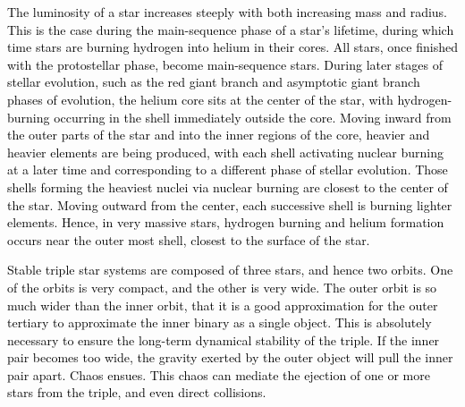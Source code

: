 \documentclass[main.tex]{subfiles}
\begin{document}
\begin{tcolorbox}[sharp corners, colback=blue!30, colframe=blue!80!blue, title=Box \refstepcounter{educhap1}\label{boxchap1:lum2 }\ref{boxchap1:lum2} -- Dependence of luminosity on Mass and Radius]
\par \textcolor{black} {The luminosity of a star increases steeply with both increasing mass and radius.  This is the case during the main-sequence phase of a star's lifetime, during which time stars are burning hydrogen into helium in their cores.  All stars, once finished with the protostellar phase, become main-sequence stars.  During later stages of stellar evolution, such as the red giant branch and asymptotic giant branch phases of evolution, the helium core sits at the center of the star, with hydrogen-burning occurring in the shell immediately outside the core.  Moving inward from the outer parts of the star and into the inner regions of the core, heavier and heavier elements are being produced, with each shell activating nuclear burning at a later time and corresponding to a different phase of stellar evolution.  Those shells forming the heaviest nuclei via nuclear burning are closest to the center of the star.  Moving outward from the center, each successive shell is burning lighter elements.  Hence, in very massive stars, hydrogen burning and helium formation occurs near the outer most shell, closest to the surface of the star.}
\end{tcolorbox}

\begin{tcolorbox}[sharp corners, colback=red!30, colframe=red!80!blue, title=Box \refstepcounter{educhap1}\label{boxchap1:ds}\ref{boxchap1:ds} -- Dynamical Stability]
\par \textcolor{black}{Stable triple star systems are composed of three stars, and hence two orbits.  One of the orbits is very compact, and the other is very wide.  The outer orbit is so much wider than the inner orbit, that it is a good approximation for the outer tertiary to approximate the inner binary as a single object.  This is absolutely necessary to ensure the long-term dynamical stability of the triple.  If the inner pair becomes too wide, the gravity exerted by the outer object will pull the inner pair apart.  Chaos ensues.  This chaos can mediate the ejection of one or more stars from the triple, and even direct collisions.}  
\end{tcolorbox}
\end{document}
